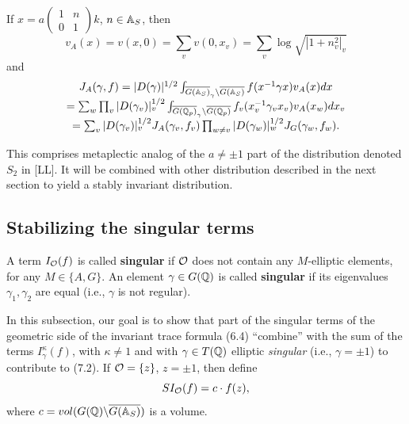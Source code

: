 If $x=a
\left(
\begin{array}{cc}
1&n\\
0&1
\end{array}
\right) k$, $n\in \mathbb{A} _S$, then
\begin{equation}
v_A(x)
=v(x,0)=\sum_v v(0,x_v)=
\sum_v \log\sqrt{|1+n_v^2|_v}
\end{equation}
and
\begin{equation}
\begin{array}{c}
J_A(\gamma,f)
=|D(\gamma)|^{1/2}
\int_{\overline{G(\mathbb{A} _S)}_\gamma
\backslash \overline{G(\mathbb{A} _S)}}
f(x^{-1}\gamma x)v_A(x)dx\\
=
\sum_w\prod_v
|D(\gamma_v)|_v^{1/2}
\int_{\overline{G(\mathbb{Q} _p)}_\gamma
\backslash \overline{G(\mathbb{Q} _p)}}
f_v(x_v^{-1}\gamma_v x_v)v_A(x_w)dx_v\\
=\sum_v |D(\gamma_v)|_v^{1/2} J_A(\gamma_v,f_v)
\prod_{w\not= v}|D(\gamma_w)|_w^{1/2} J_G(\gamma_w,f_w).
\end{array}
\end{equation}

\begin{remark} This comprises metaplectic analog of
the $a\not= \pm 1$
part of the distribution denoted $S_2$ in [LL]. It
will be combined with other distribution
described in the next section to yield a stably
invariant distribution.
\end{remark}

\subsection{Stabilizing the singular terms}

A term $I_{\cal{O}}(f)$ is called {\bf singular} if ${\cal{O}}$
does not contain any $M$-elliptic elements, for any $M\in \{A,G\}$.
An element $\gamma\in G(\mathbb{Q} )$ is called {\bf singular}
if its eigenvalues $\gamma_1,\gamma_2$ are equal (i.e.,
$\gamma$ is not regular).

In this subsection, our goal is to show that part of
the singular terms of the geometric side of the invariant
trace formula (6.4) ``combine'' with the sum of the terms
$I_\gamma ^\kappa (f)$,
with $\kappa \neq 1$ and with
$\gamma \in T(\mathbb{Q} )$ elliptic \emph{singular}
(i.e., $\gamma =\pm 1$) to contribute to (7.2). 
If ${\cal O}=\{z\}$, $z=\pm 1$, then define
\begin{equation}
SI_{\cal O}(f)=c\cdot f(z),
\end{equation}
where $c=vol(G({\Bbb Q})\backslash \overline{G(\mathbb{A} _S)})$ is a volume.

